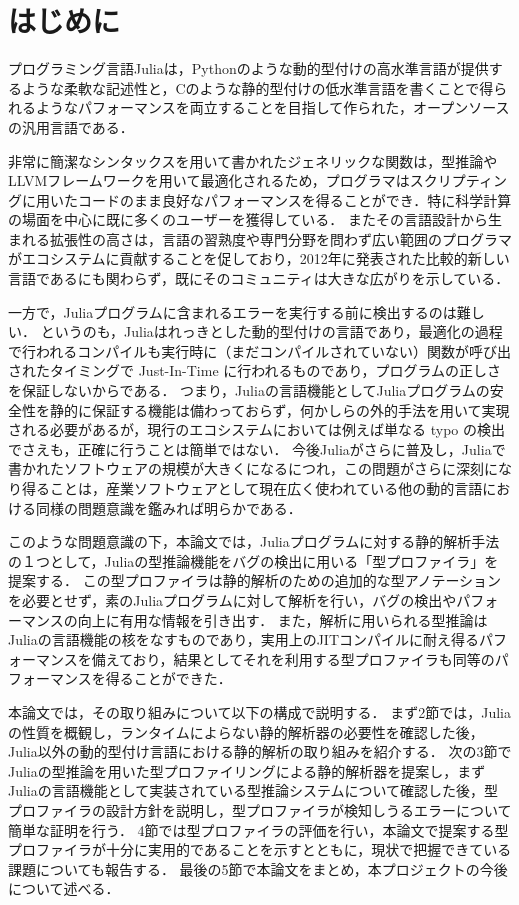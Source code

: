 
\section{はじめに}

プログラミング言語Juliaは，Pythonのような動的型付けの高水準言語が提供するような柔軟な記述性と，Cのような静的型付けの低水準言語を書くことで得られるようなパフォーマンスを両立することを目指して作られた，オープンソースの汎用言語である．

非常に簡潔なシンタックスを用いて書かれたジェネリックな関数は，型推論やLLVMフレームワークを用いて最適化されるため，プログラマはスクリプティングに用いたコードのまま良好なパフォーマンスを得ることができ．特に科学計算の場面を中心に既に多くのユーザーを獲得している．
またその言語設計から生まれる拡張性の高さは，言語の習熟度や専門分野を問わず広い範囲のプログラマがエコシステムに貢献することを促しており，2012年に発表された比較的新しい言語であるにも関わらず，既にそのコミュニティは大きな広がりを示している．

一方で，Juliaプログラムに含まれるエラーを実行する前に検出するのは難しい．
というのも，Juliaはれっきとした動的型付けの言語であり，最適化の過程で行われるコンパイルも実行時に（まだコンパイルされていない）関数が呼び出されたタイミングで Just-In-Time に行われるものであり，プログラムの正しさを保証しないからである．
つまり，Juliaの言語機能としてJuliaプログラムの安全性を静的に保証する機能は備わっておらず，何かしらの外的手法を用いて実現される必要があるが，現行のエコシステムにおいては例えば単なる typo の検出でさえも，正確に行うことは簡単ではない．
今後Juliaがさらに普及し，Juliaで書かれたソフトウェアの規模が大きくになるにつれ，この問題がさらに深刻になり得ることは，産業ソフトウェアとして現在広く使われている他の動的言語における同様の問題意識を鑑みれば明らかである．

このような問題意識の下，本論文では，Juliaプログラムに対する静的解析手法の１つとして，Juliaの型推論機能をバグの検出に用いる「型プロファイラ」を提案する．
この型プロファイラは静的解析のための追加的な型アノテーションを必要とせず，素のJuliaプログラムに対して解析を行い，バグの検出やパフォーマンスの向上に有用な情報を引き出す．
また，解析に用いられる型推論はJuliaの言語機能の核をなすものであり，実用上のJITコンパイルに耐え得るパフォーマンスを備えており，結果としてそれを利用する型プロファイラも同等のパフォーマンスを得ることができた．

本論文では，その取り組みについて以下の構成で説明する．
まず2節では，Juliaの性質を概観し，ランタイムによらない静的解析器の必要性を確認した後，Julia以外の動的型付け言語における静的解析の取り組みを紹介する．
次の3節でJuliaの型推論を用いた型プロファイリングによる静的解析器を提案し，まずJuliaの言語機能として実装されている型推論システムについて確認した後，型プロファイラの設計方針を説明し，型プロファイラが検知しうるエラーについて簡単な証明を行う．
4節では型プロファイラの評価を行い，本論文で提案する型プロファイラが十分に実用的であることを示すとともに，現状で把握できている課題についても報告する．
最後の5節で本論文をまとめ，本プロジェクトの今後について述べる．
